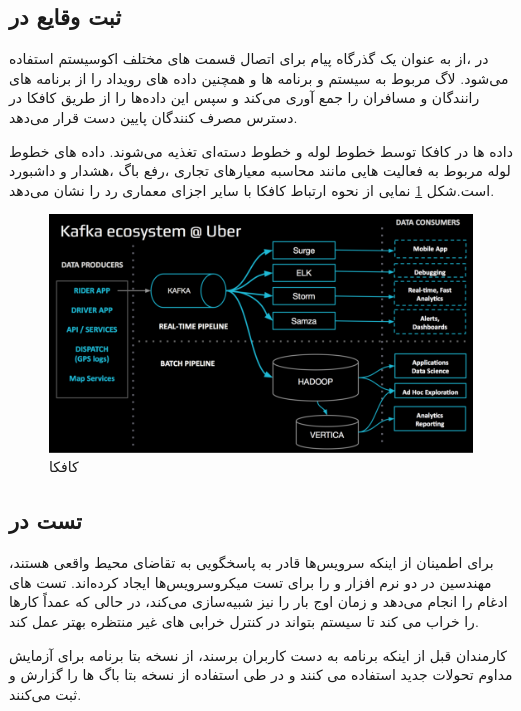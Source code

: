 \subsection{ثبت وقایع در }
در ،از \cite{kafka} به عنوان یک گذرگاه پیام برای اتصال قسمت های مختلف اکوسیستم استفاده می‌شود. لاگ مربوط به سیستم و برنامه ها و همچنین داده های رویداد را از برنامه های رانندگان و مسافران را جمع آوری می‌کند و سپس این داده‌‌ها را از طریق کافکا در دسترس مصرف کنندگان پایین دست قرار می‌دهد.

داده ها در کافکا توسط خطوط لوله  و خطوط دسته‌ای تغذیه می‌شوند. داده های خطوط لوله مربوط به فعالیت هایی مانند محاسبه معیارهای تجاری ،رفع باگ ،هشدار و داشبورد است.شکل \ref{fig:kafka} نمایی از نحوه ارتباط کافکا با سایر اجزای معماری رد  را نشان می‌دهد.\cite{kafka}

\begin{figure}[h]
\centering
\includegraphics[scale=0.3]{kafka.png}
\caption{کافکا}
\label{fig:kafka}
\end{figure}


\subsection{تست در }
برای اطمینان از اینکه سرویس‌ها قادر به پاسخگویی به تقاضای محیط واقعی هستند، مهندسین در   دو نرم افزار  و  را برای تست میکروسرویس‌‌ها ایجاد کرده‌اند. تست های ادغام را انجام می‌دهد و زمان اوج بار را نیز شبیه‌سازی می‌کند، در حالی که  عمداً کارها را خراب می کند تا سیستم بتواند در کنترل خرابی های غیر منتظره بهتر عمل کند.

کارمندان  قبل از اینکه برنامه به دست کاربران برسند، از نسخه بتا برنامه برای آزمایش مداوم تحولات جدید استفاده می کنند و در طی استفاده از نسخه بتا باگ ها را گزارش و ثبت می‌کنند.\cite{techstack}


